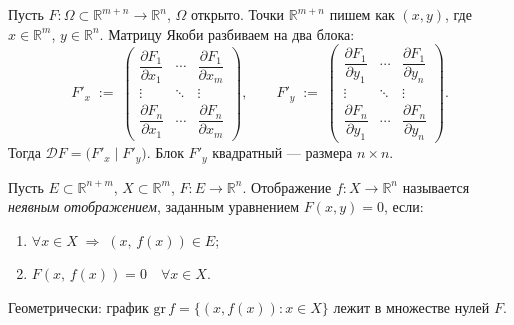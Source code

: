 



\begin{note}[Обозначения]
  Пусть $F : \Omega \subset \mathbb{R}^{m+n} \to \mathbb{R}^n$, $\Omega$ открыто.
  Точки $\mathbb{R}^{m+n}$ пишем как $(x, y)$, где $x \in \mathbb{R}^m$,
  $y \in \mathbb{R}^n$. Матрицу Якоби разбиваем на два блока:
  \[
    F'_x \;:=\;
    \begin{pmatrix}
      \dfrac{\partial F_1}{\partial x_1} & \cdots &
      \dfrac{\partial F_1}{\partial x_m} \\[6pt]
      \vdots & \ddots & \vdots \\[2pt]
      \dfrac{\partial F_n}{\partial x_1} & \cdots &
      \dfrac{\partial F_n}{\partial x_m}
    \end{pmatrix},
    \qquad
    F'_y \;:=\;
    \begin{pmatrix}
      \dfrac{\partial F_1}{\partial y_1} & \cdots &
      \dfrac{\partial F_1}{\partial y_n} \\[6pt]
      \vdots & \ddots & \vdots \\[2pt]
      \dfrac{\partial F_n}{\partial y_1} & \cdots &
      \dfrac{\partial F_n}{\partial y_n}
    \end{pmatrix}.
  \]
  Тогда $\mathcal{D}F = \bigl(F'_x \;\big|\; F'_y\bigr)$.
  Блок $F'_y$ квадратный --- размера $n \times n$.
\end{note}


\begin{defn}
  Пусть $E \subset \mathbb{R}^{n+m}$, $X \subset \mathbb{R}^m$,
  $F : E \to \mathbb{R}^n$.
  Отображение $f : X \to \mathbb{R}^n$ называется \emph{неявным отображением},
  заданным уравнением $F(x, y) = 0$, если:
  \begin{enumerate}
    \item $\forall x \in X \;\Rightarrow\; (x,\, f(x)) \in E$;
    \item $F(x,\, f(x)) = 0 \quad \forall x \in X$.
  \end{enumerate}
  Геометрически: график $\mathrm{gr}\,f = \{(x, f(x)) : x \in X\}$
  лежит в множестве нулей $F$.
\end{defn}

